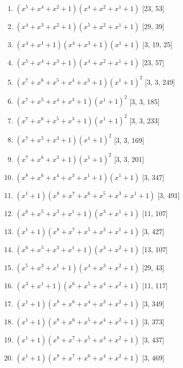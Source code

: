 \documentclass[10pt,twocolumn]{article}
\begin{document}
\begin{enumerate}
\item $(x^{5} + x^{4} + x^{2} + 1)(x^{4} + x^{2} + x^{1} + 1)$  [23, 53]
\item $(x^{4} + x^{3} + x^{2} + 1)(x^{5} + x^{2} + x^{1} + 1)$  [29, 39]
\item $(x^{4} + x^{1} + 1)(x^{4} + x^{3} + 1)(x^{1} + 1)$  [3, 19, 25]
\item $(x^{5} + x^{4} + x^{3} + 1)(x^{4} + x^{2} + x^{1} + 1)$  [23, 57]
\item $(x^{7} + x^{6} + x^{5} + x^{4} + x^{3} + 1)(x^{1} + 1)^{2}$  [3, 3, 249]
\item $(x^{7} + x^{5} + x^{4} + x^{3} + 1)(x^{1} + 1)^{2}$  [3, 3, 185]
\item $(x^{7} + x^{6} + x^{5} + x^{3} + 1)(x^{1} + 1)^{2}$  [3, 3, 233]
\item $(x^{7} + x^{5} + x^{3} + 1)(x^{1} + 1)^{2}$  [3, 3, 169]
\item $(x^{7} + x^{6} + x^{3} + 1)(x^{1} + 1)^{2}$  [3, 3, 201]
\item $(x^{8} + x^{6} + x^{4} + x^{3} + x^{1} + 1)(x^{1} + 1)$  [3, 347]
\item $(x^{1} + 1)(x^{8} + x^{7} + x^{6} + x^{5} + x^{3} + x^{1} + 1)$  [3, 491]
\item $(x^{6} + x^{5} + x^{3} + x^{1} + 1)(x^{3} + x^{1} + 1)$  [11, 107]
\item $(x^{1} + 1)(x^{8} + x^{7} + x^{5} + x^{3} + x^{1} + 1)$  [3, 427]
\item $(x^{6} + x^{5} + x^{3} + x^{1} + 1)(x^{3} + x^{2} + 1)$  [13, 107]
\item $(x^{5} + x^{3} + x^{1} + 1)(x^{4} + x^{3} + x^{2} + 1)$  [29, 43]
\item $(x^{3} + x^{1} + 1)(x^{6} + x^{5} + x^{4} + x^{2} + 1)$  [11, 117]
\item $(x^{1} + 1)(x^{8} + x^{6} + x^{4} + x^{3} + x^{2} + 1)$  [3, 349]
\item $(x^{1} + 1)(x^{8} + x^{6} + x^{5} + x^{4} + x^{2} + 1)$  [3, 373]
\item $(x^{1} + 1)(x^{8} + x^{7} + x^{5} + x^{4} + x^{2} + 1)$  [3, 437]
\item $(x^{1} + 1)(x^{8} + x^{7} + x^{6} + x^{4} + x^{2} + 1)$  [3, 469]
\end{enumerate}
\end{document}
